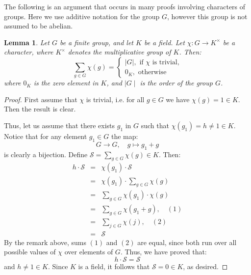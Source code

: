 \documentclass[12pt]{article}
\newtheorem{lemma}{Lemma}
\begin{document}
The following is an argument that occurs in many proofs involving characters of groups. Here we use additive notation for the group $G$, however this group is not assumed to be abelian.

\begin{lemma}
Let $G$ be a finite group, and let $K$ be a field. Let $\chi\colon G\to K^{\times}$ be a character, where $K^{\times}$ denotes the multiplicative group of $K$. Then:
$$\sum_{g\in G} \chi(g) =\begin{cases}
\mid G \mid, \text{ if } \chi \text{ is trivial,}\\
0_K, \text{ otherwise}
\end{cases}$$
where $0_K$ is the zero element in $K$, and $\mid G \mid$ is the order of the group $G$.
\end{lemma}
\begin{proof}
First assume that $\chi$ is trivial, i.e. for all $g\in G$ we have $\chi(g)=1\in K$. Then the result is clear.

Thus, let us assume that there exists $g_1$ in $G$ such that $\chi(g_1)=h\neq 1\in K$. Notice that for any element $g_1\in G$ the map:
$$ G \to G,\quad g\mapsto g_1+g $$
is clearly a bijection. Define $\mathcal{S}=\sum_{g\in G} \chi(g)\in K$. Then:
\begin{eqnarray*}
h\cdot\mathcal{S} &=& \chi(g_1)\cdot\mathcal{S}\\
&=& \chi(g_1)\cdot \sum_{g\in G}\chi(g)\\
&=& \sum_{g\in G}\chi(g_1)\cdot\chi(g)\\
&=& \sum_{g\in G}\chi(g_1 + g),\quad (1)\\
&=& \sum_{j\in G}\chi(j),\quad (2)\\
&=& \mathcal{S}
\end{eqnarray*}
By the remark above, sums $(1)$ and $(2)$ are equal, since both run over all possible values of $\chi$ over elements of $G$. Thus, we have proved that:
$$h\cdot \mathcal{S}=\mathcal{S}$$
and $h\neq 1\in K$. Since $K$ is a field, it follows that $\mathcal{S}=0\in K$, as desired.

\end{proof}
\end{document}
